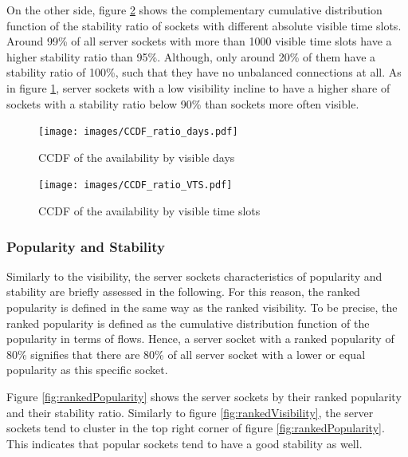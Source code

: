 On the other side, figure \ref{fig:ccdf_ratio_vts} shows the complementary
cumulative distribution function of the stability ratio of sockets with
different absolute visible time slots. Around 99\% of all \glspl{server socket}
with more than 1000 visible time slots have a higher stability ratio than 95\%.
Although, only around 20\% of them have a stability ratio of 100\%, such that
they have no unbalanced connections at all.
As in figure \ref{fig:ccdf_ratio_days}, \glspl{server socket} with a low
visibility incline to have a higher share of sockets with a stability ratio
below 90\% than sockets more often visible.

\begin{landscape}
\begin{figure}
	[p] \centering
	\texttt{[image: images/CCDF\_ratio\_days.pdf]}
	\caption{CCDF of the availability by visible days}
	\label{fig:ccdf_ratio_days}
\end{figure}
\end{landscape}

\begin{landscape}
\begin{figure}
	[p] \centering
	\texttt{[image: images/CCDF\_ratio\_VTS.pdf]}
	\caption{CCDF of the availability by visible time slots}
	\label{fig:ccdf_ratio_vts}
\end{figure}
\end{landscape}

\subsubsection{Popularity and Stability}
Similarly to the visibility, the \glspl{server socket} characteristics of
popularity and stability are briefly assessed in the following. For this reason,
the ranked popularity is defined in the same way as the ranked visibility.
To be precise, the ranked popularity is defined as the cumulative distribution
function of the popularity in terms of flows. Hence, a \gls{server socket} with
a ranked popularity of 80\% signifies that there are 80\% of all \gls{server
socket} with a lower or equal popularity as this specific socket.

Figure \ref{fig:rankedPopularity} shows the \glspl{server socket} by their
ranked popularity and their stability ratio. Similarly to figure
\ref{fig:rankedVisibility}, the \glspl{server socket} tend to cluster in the top
right corner of figure \ref{fig:rankedPopularity}. This indicates that popular
sockets tend to have a good stability as well.

